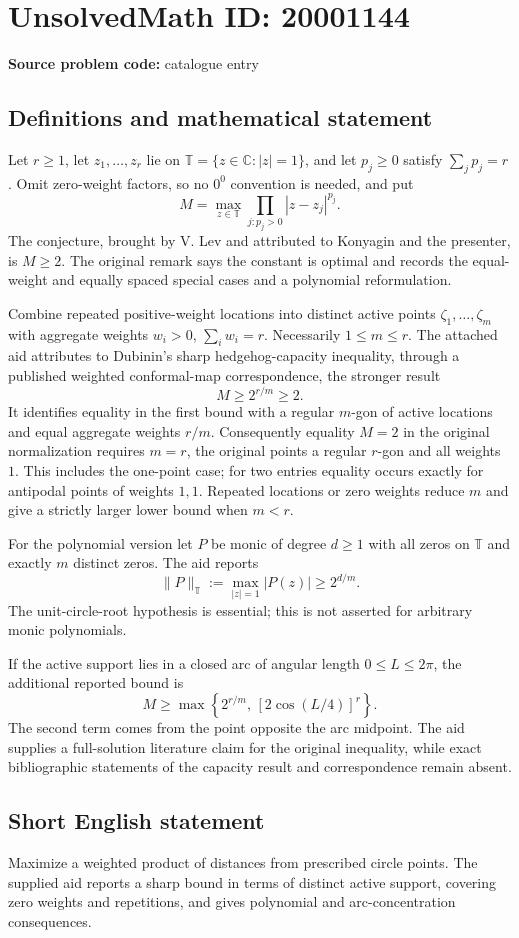 \documentclass[11pt]{article}
\newcommand{\C}{\mathbb{C}}
\begin{document}
\section*{UnsolvedMath ID: 20001144}
\textbf{Source problem code:} catalogue entry
\subsection{Definitions and mathematical statement}
Let $r\ge1$, let $z_1,\ldots,z_r$ lie on $\mathbb T=\{z\in\C:|z|=1\}$, and let $p_j\ge0$ satisfy $\sum_jp_j=r$. Omit zero-weight factors, so no $0^0$ convention is needed, and put
\[
M=\max_{z\in\mathbb T}\prod_{j:p_j>0}|z-z_j|^{p_j}.
\]
The conjecture, brought by V. Lev and attributed to Konyagin and the presenter, is $M\ge2$. The original remark says the constant is optimal and records the equal-weight and equally spaced special cases and a polynomial reformulation.

Combine repeated positive-weight locations into distinct active points $\zeta_1,\ldots,\zeta_m$ with aggregate weights $w_i>0$, $\sum_iw_i=r$. Necessarily $1\le m\le r$. The attached aid attributes to Dubinin's sharp hedgehog-capacity inequality, through a published weighted conformal-map correspondence, the stronger result
\[
M\ge2^{r/m}\ge2.
\]
It identifies equality in the first bound with a regular $m$-gon of active locations and equal aggregate weights $r/m$. Consequently equality $M=2$ in the original normalization requires $m=r$, the original points a regular $r$-gon and all weights $1$. This includes the one-point case; for two entries equality occurs exactly for antipodal points of weights $1,1$. Repeated locations or zero weights reduce $m$ and give a strictly larger lower bound when $m<r$.

For the polynomial version let $P$ be monic of degree $d\ge1$ with all zeros on $\mathbb T$ and exactly $m$ distinct zeros. The aid reports
\[
\|P\|_{\mathbb T}:=\max_{|z|=1}|P(z)|\ge2^{d/m}.
\]
The unit-circle-root hypothesis is essential; this is not asserted for arbitrary monic polynomials.

If the active support lies in a closed arc of angular length $0\le L\le2\pi$, the additional reported bound is
\[
M\ge\max\left\{2^{r/m},\,[2\cos(L/4)]^r\right\}.
\]
The second term comes from the point opposite the arc midpoint. The aid supplies a full-solution literature claim for the original inequality, while exact bibliographic statements of the capacity result and correspondence remain absent.
\subsection{Short English statement}
Maximize a weighted product of distances from prescribed circle points. The supplied aid reports a sharp bound in terms of distinct active support, covering zero weights and repetitions, and gives polynomial and arc-concentration consequences.
\end{document}
